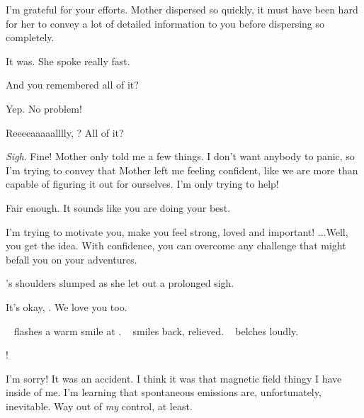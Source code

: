 \documentclass[main.tex]{subfiles}
\begin{document}
\par \Sterope I'm grateful for your efforts.  Mother dispersed so quickly, it must have been hard for her to convey a lot of detailed information to you before dispersing so completely.

\par \Maia It was.  She spoke really fast.

\par \Sterope And you remembered all of it?

\par \Maia Yep.  No problem!  

\par \Sterope Reeeeaaaaalllly, \rmmaia?  All of it?

\par \Maia \textit{Sigh}.  Fine!  Mother only told me a few things.  I don't want anybody to panic, so I'm trying to convey that Mother left me feeling confident, like we are more than capable of figuring it out for ourselves.  I'm only trying to help!  

\par \Sterope Fair enough.  It sounds like you are doing your best.

\par \Maia I'm trying to motivate you, make you feel strong, loved and important!  ...Well, you get the idea.  With confidence, you can overcome any challenge that might befall you on your adventures.

\par \nar \rmmaia's shoulders slumped as she let out a prolonged sigh.

\par \Sterope It's okay, \rmmaia.  We love you too.

\par \nar \rmsterope~ flashes a warm smile at \rmmaia.  \rmmaia~ smiles back, relieved.  \rmalcyone~ belches loudly.

\par \Sterope \rmalcyone!

\par \Alcyone I'm sorry!  It was an accident.  I think it was that magnetic field thingy I have inside of me.  I'm learning that spontaneous emissions are, unfortunately, inevitable.  Way out of \textit{my} control, at least.
\end{document}
